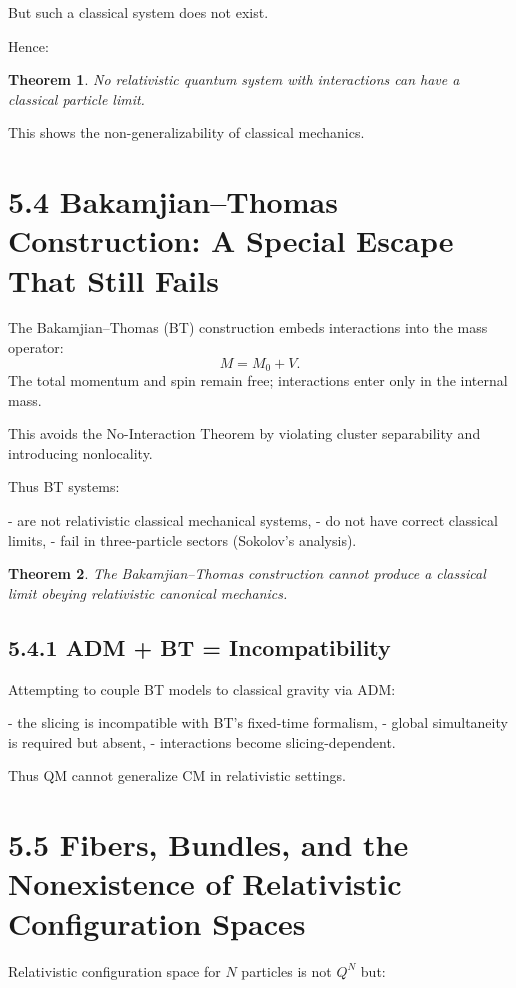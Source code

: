 \documentclass[12pt,oneside]{book}
\theoremstyle{plain}
\newtheorem{theorem}{Theorem}[chapter]
\theoremstyle{definition}
\begin{document}
But such a classical system does not exist.

Hence:

\begin{theorem}
No relativistic quantum system with interactions can have a classical particle limit.
\end{theorem}

This shows the non-generalizability of classical mechanics.

\section{5.4 Bakamjian–Thomas Construction: A Special Escape That Still Fails}

The Bakamjian–Thomas (BT) construction embeds interactions into the mass operator:
\[
M = M_0 + V.
\]
The total momentum and spin remain free; interactions enter only in the internal mass.

This avoids the No-Interaction Theorem by violating cluster separability and introducing nonlocality.

Thus BT systems:

- are not relativistic classical mechanical systems,
- do not have correct classical limits,
- fail in three-particle sectors (Sokolov’s analysis).

\begin{theorem}
The Bakamjian–Thomas construction cannot produce a classical limit obeying relativistic canonical mechanics.
\end{theorem}

\subsection{5.4.1 ADM + BT = Incompatibility}

Attempting to couple BT models to classical gravity via ADM:

- the slicing is incompatible with BT’s fixed-time formalism,
- global simultaneity is required but absent,
- interactions become slicing-dependent.

Thus QM cannot generalize CM in relativistic settings.

\section{5.5 Fibers, Bundles, and the Nonexistence of Relativistic Configuration Spaces}

Relativistic configuration space for $N$ particles is not $Q^N$ but:
\end{document}

